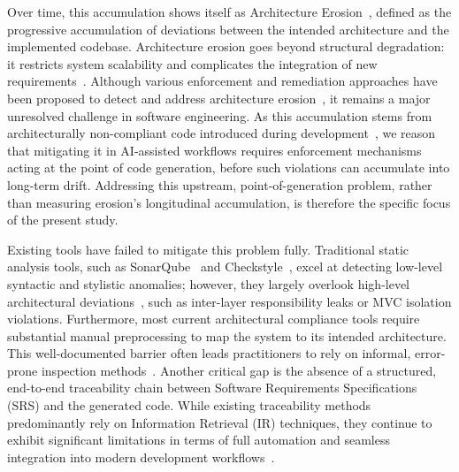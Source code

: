 Over time, this accumulation shows itself as Architecture
Erosion~\citep{Li2022}, defined as the progressive accumulation of
deviations between the intended architecture and the implemented
codebase. Architecture erosion goes beyond structural degradation: it restricts system
scalability and complicates the integration of new
requirements~\citep{Li2022}. Although various enforcement and
remediation approaches have been proposed to detect and address
architecture erosion~\citep{Li2022}, it remains a major unresolved
challenge in software engineering. As this accumulation stems from
architecturally non-compliant code introduced during development~\citep{Li2022},
we reason that mitigating it in AI-assisted workflows requires enforcement
mechanisms acting at the point of code generation, before such violations
can accumulate into long-term drift. Addressing this upstream,
point-of-generation problem, rather than measuring erosion's longitudinal
accumulation, is therefore the specific focus of the present study.

Existing tools have failed to mitigate this problem fully. Traditional
static analysis tools, such as SonarQube~\citep{SonarQube} and
Checkstyle~\citep{Checkstyle}, excel at detecting low-level syntactic
and stylistic anomalies; however, they largely overlook high-level
architectural deviations~\citep{Fontana2017}, such as inter-layer
responsibility leaks or MVC isolation violations. Furthermore, most current
architectural compliance tools require substantial manual preprocessing
to map the system to its intended architecture. This well-documented
barrier often leads practitioners to rely on informal, error-prone
inspection methods~\citep{Ali2018}. Another critical gap is the absence
of a structured, end-to-end traceability chain between Software
Requirements Specifications (SRS) and the generated code. While
existing traceability methods predominantly rely on Information
Retrieval (IR) techniques, they continue to exhibit significant
limitations in terms of full automation and seamless integration into
modern development workflows~\citep{Koboyatshwene2025}.

